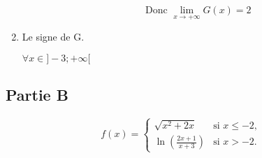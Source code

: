 \documentclass[12pt,a4paper]{article}
\begin{document}
\begin{enumerate}
\begin{enumerate}
\[
\text{Donc } \lim_{x \to +\infty} G(x) = 2
\]

\begin{center}
\end{center}

\end{enumerate}
\item  Le signe de G.

\(\forall x \in ]-3;+\infty[\)
\end{enumerate}

\subsection*{Partie B}

\[
f(x) =
\begin{cases}
\sqrt{x^2 + 2x} & \text{si } x \leq -2, \\
\ln\left(\frac{2x + 1}{x + 3}\right) & \text{si } x > -2.
\end{cases}
\]
\end{document}

